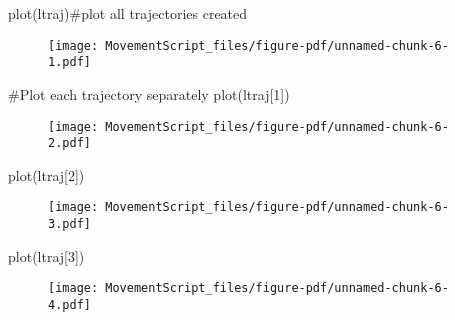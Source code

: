 \documentclass[
  letterpaper,
]{book}
\newenvironment{Shaded}{\begin{snugshade}}{\end{snugshade}}
\newcommand{\CommentTok}[1]{\textcolor[rgb]{0.37,0.37,0.37}{#1}}
\newcommand{\DecValTok}[1]{\textcolor[rgb]{0.68,0.00,0.00}{#1}}
\newcommand{\FunctionTok}[1]{\textcolor[rgb]{0.28,0.35,0.67}{#1}}
\newcommand{\NormalTok}[1]{\textcolor[rgb]{0.00,0.23,0.31}{#1}}
\begin{document}
\begin{Shaded}
\begin{Highlighting}[]
\FunctionTok{plot}\NormalTok{(ltraj)}\CommentTok{\#plot all trajectories created}
\end{Highlighting}
\end{Shaded}

\begin{figure}[H]

{\centering \texttt{[image: MovementScript\_files/figure-pdf/unnamed-chunk-6-1.pdf]}

}

\end{figure}

\begin{Shaded}
\begin{Highlighting}[]
\CommentTok{\#Plot each trajectory separately}
\FunctionTok{plot}\NormalTok{(ltraj[}\DecValTok{1}\NormalTok{])}
\end{Highlighting}
\end{Shaded}

\begin{figure}[H]

{\centering \texttt{[image: MovementScript\_files/figure-pdf/unnamed-chunk-6-2.pdf]}

}

\end{figure}

\begin{Shaded}
\begin{Highlighting}[]
\FunctionTok{plot}\NormalTok{(ltraj[}\DecValTok{2}\NormalTok{])}
\end{Highlighting}
\end{Shaded}

\begin{figure}[H]

{\centering \texttt{[image: MovementScript\_files/figure-pdf/unnamed-chunk-6-3.pdf]}

}

\end{figure}

\begin{Shaded}
\begin{Highlighting}[]
\FunctionTok{plot}\NormalTok{(ltraj[}\DecValTok{3}\NormalTok{])}
\end{Highlighting}
\end{Shaded}

\begin{figure}[H]

{\centering \texttt{[image: MovementScript\_files/figure-pdf/unnamed-chunk-6-4.pdf]}

}

\end{figure}
\end{document}
